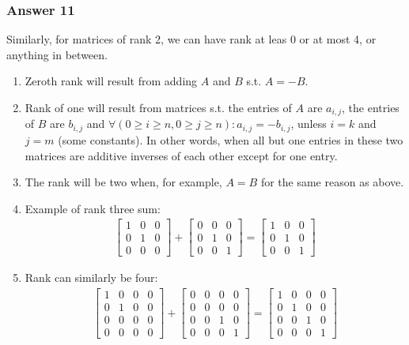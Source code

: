\documentclass[11pt]{article}
\begin{document}
\subsubsection{Answer 11}
\label{sec-1-5-2}
Similarly, for matrices of rank 2, we can have rank at leas 0 or at most 4,
or anything in between.
\begin{enumerate}
\item Zeroth rank will result from adding $A$ and $B$ s.t. $A = -B$.
\item Rank of one will result from matrices s.t. the entries of $A$ are
$a_{i,j}$, the entries of $B$ are $b_{i,j}$ and $\forall (0 \geq i \geq n,
       0 \geq j \geq n): a_{i, j} = -b_{i, j}$, unless $i = k$ and $j = m$ (some
constants).  In other words, when all but one entries in these two
matrices are additive inverses of each other except for one entry.
\item The rank will be two when, for example, $A = B$ for the same reason as
above.
\item Example of rank three sum:
\begin{align*}
  \begin{bmatrix}
    1 & 0 & 0 \\
    0 & 1 & 0 \\
    0 & 0 & 0
  \end{bmatrix} +
  \begin{bmatrix}
    0 & 0 & 0 \\
    0 & 1 & 0 \\
    0 & 0 & 1
  \end{bmatrix} = 
  \begin{bmatrix}
    1 & 0 & 0 \\
    0 & 1 & 0 \\
    0 & 0 & 1
  \end{bmatrix}
\end{align*}

\item Rank can similarly be four:
\begin{align*}
  \begin{bmatrix}
    1 & 0 & 0 & 0 \\
    0 & 1 & 0 & 0 \\
    0 & 0 & 0 & 0 \\
    0 & 0 & 0 & 0
  \end{bmatrix} +
  \begin{bmatrix}
    0 & 0 & 0 & 0 \\
    0 & 0 & 0 & 0 \\
    0 & 0 & 1 & 0 \\
    0 & 0 & 0 & 1
  \end{bmatrix} = 
  \begin{bmatrix}
    1 & 0 & 0 & 0 \\
    0 & 1 & 0 & 0 \\
    0 & 0 & 1 & 0 \\
    0 & 0 & 0 & 1
  \end{bmatrix}
\end{align*}


\end{enumerate}
\end{document}
